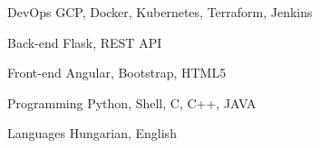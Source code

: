 

\begin{cvskills}

  \cvskill
    {DevOps} %
    {GCP, Docker, Kubernetes, Terraform, Jenkins} %

  \cvskill
    {Back-end} %
    {Flask, REST API} %

  \cvskill
    {Front-end} %
    {Angular, Bootstrap, HTML5} %

  \cvskill
    {Programming} %
    {Python, Shell, C, C++, JAVA} %

  \cvskill
    {Languages} %
    {Hungarian, English} %

\end{cvskills}
